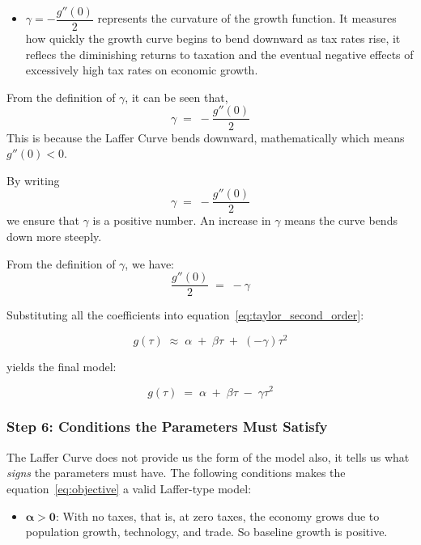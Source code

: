 \documentclass[12pt,a4paper]{report}
\theoremstyle{definition}
\theoremstyle{plain}
\theoremstyle{remark}
\begin{document}
{\begin{itemize}
			\item \textbf{\(\gamma = -\dfrac{g''(0)}{2}\)} represents the curvature of the growth function. It measures how quickly the growth curve begins to bend downward as tax rates rise, it reflecs the diminishing returns to taxation and the eventual negative effects of excessively high tax rates on economic growth.
		\end{itemize}
		
		\medskip
		
		From the definition of $\gamma$, it can be seen that, 
		\[
		\gamma \;=\; -\frac{g''(0)}{2}
		\]
		This is because the Laffer Curve bends downward, mathematically which means $g''(0) < 0$.
		
		By writing \[
		\gamma \;=\; -\frac{g''(0)}{2}
		\] we ensure that $\gamma$ is a
		positive number. 
		An increase in $\gamma$ means the
		curve bends down more steeply.
		
		From the definition of $\gamma$, we have:
		\[
		\frac{g''(0)}{2} \;=\; -\gamma
		\]
		
		Substituting all the coefficients into equation~\eqref{eq:taylor_second_order}:
		
		\begin{equation}
			g(\tau) \;\approx\; \alpha \;+\; \beta\tau \;+\; (-\gamma)\tau^2
			\label{eq:before_box}
		\end{equation}
		
		yields the final model:
		
		\begin{equation}
			g(\tau) \;=\; \alpha \;+\; \beta\tau \;-\; \gamma\tau^2
			\label{eq:objective}
		\end{equation}
		
		\subsubsection*{Step 6: Conditions the Parameters Must Satisfy}
		
		The Laffer Curve does not provide us the form of the model also, it tells us what \emph{signs} the parameters must have.
		The following conditions makes the equation~\eqref{eq:objective} a valid
		Laffer-type model:
		
		
		\begin{itemize}[leftmargin=1.5em]
			\item $\boldsymbol{\alpha > 0}$: With no taxes, that is, at zero taxes, the economy grows due to
			population growth, technology, and trade. So baseline growth is positive.
			

\end{itemize}}
\end{document}
